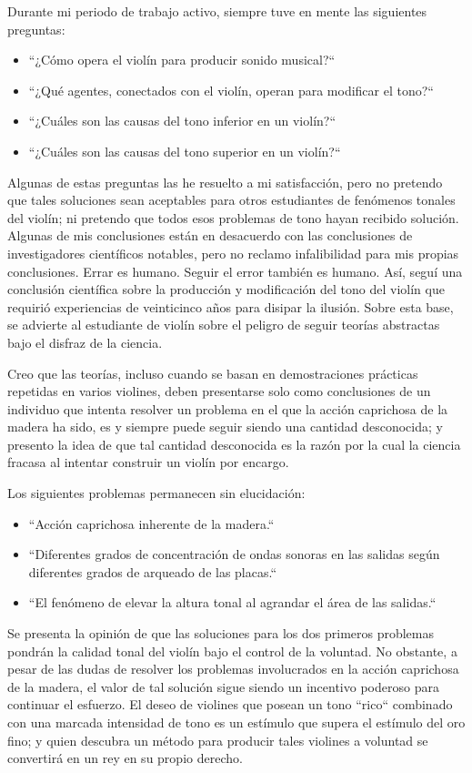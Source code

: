 \documentclass[12pt]{book}
\begin{document}
Durante mi periodo de trabajo activo, siempre tuve en mente las siguientes preguntas:
\begin{itemize}
    \item ``¿Cómo opera el violín para producir sonido musical?``
    \item ``¿Qué agentes, conectados con el violín, operan para modificar el tono?``
    \item ``¿Cuáles son las causas del tono inferior en un violín?``
    \item ``¿Cuáles son las causas del tono superior en un violín?``
\end{itemize}

Algunas de estas preguntas las he resuelto a mi satisfacción, pero no pretendo que tales soluciones sean aceptables para otros estudiantes de fenómenos tonales del violín; ni pretendo que todos esos problemas de tono hayan recibido solución. Algunas de mis conclusiones están en desacuerdo con las conclusiones de investigadores científicos notables, pero no reclamo infalibilidad para mis propias conclusiones. Errar es humano. Seguir el error también es humano. Así, seguí una conclusión científica sobre la producción y modificación del tono del violín que requirió experiencias de veinticinco años para disipar la ilusión. Sobre esta base, se advierte al estudiante de violín sobre el peligro de seguir teorías abstractas bajo el disfraz de la ciencia.

Creo que las teorías, incluso cuando se basan en demostraciones prácticas repetidas en varios violines, deben presentarse solo como conclusiones de un individuo que intenta resolver un problema en el que la acción caprichosa de la madera ha sido, es y siempre puede seguir siendo una cantidad desconocida; y presento la idea de que tal cantidad desconocida es la razón por la cual la ciencia fracasa al intentar construir un violín por encargo.

Los siguientes problemas permanecen sin elucidación:
\begin{itemize}
    \item ``Acción caprichosa inherente de la madera.``
    \item ``Diferentes grados de concentración de ondas sonoras en las salidas según diferentes grados de arqueado de las placas.``
    \item ``El fenómeno de elevar la altura tonal al agrandar el área de las salidas.``
\end{itemize}

Se presenta la opinión de que las soluciones para los dos primeros problemas pondrán la calidad tonal del violín bajo el control de la voluntad. No obstante, a pesar de las dudas de resolver los problemas involucrados en la acción caprichosa de la madera, el valor de tal solución sigue siendo un incentivo poderoso para continuar el esfuerzo. El deseo de violines que posean un tono ``rico`` combinado con una marcada intensidad de tono es un estímulo que supera el estímulo del oro fino; y quien descubra un método para producir tales violines a voluntad se convertirá en un rey en su propio derecho.
\end{document}
